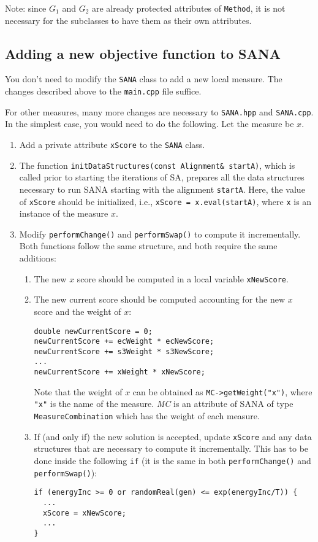 \documentclass[]{article}
\begin{document}
Note: since $G_1$ and $G_2$ are already protected attributes of \texttt{Method}, it is not necessary for the subclasses to have them as their own attributes.

\subsection{Adding a new objective function to SANA}

You don't need to modify the \texttt{SANA} class to add a new local measure. The changes described above to the \texttt{main.cpp} file suffice.

For other measures, many more changes are necessary to \texttt{SANA.hpp} and \texttt{SANA.cpp}. In the simplest case, you would need to do the following. Let the measure be $x$.
\begin{enumerate}
\item Add a private attribute \texttt{xScore} to the \texttt{SANA} class.
\item The function \texttt{initDataStructures(const Alignment\& startA)}, which is called prior to starting the iterations of SA, prepares all the data structures necessary to run SANA starting with the alignment \texttt{startA}. Here, the value of \texttt{xScore} should be initialized, i.e., \texttt{xScore = x.eval(startA)}, where \texttt{x} is an instance of the measure $x$.
\item Modify \texttt{performChange()} and \texttt{performSwap()} to compute it incrementally. Both functions follow the same structure, and both require the same additions:
\begin{enumerate}
\item The new $x$ score should be computed in a local variable \texttt{xNewScore}.
\item The new current score should be computed accounting for the new $x$ score and the weight of $x$:
\begin{verbatim}
double newCurrentScore = 0;
newCurrentScore += ecWeight * ecNewScore;
newCurrentScore += s3Weight * s3NewScore;
...
newCurrentScore += xWeight * xNewScore;
\end{verbatim}
Note that the weight of $x$ can be obtained as \texttt{MC->getWeight("x")}, where \texttt{"x"} is the name of the measure. \emph{MC} is an attribute of SANA of type \texttt{MeasureCombination} which has the weight of each measure.
\item If (and only if) the new solution is accepted, update \texttt{xScore} and any data structures that are necessary to compute it incrementally. This has to be done inside the following \texttt{if} (it is the same in both \texttt{performChange()} and \texttt{performSwap()}):
\begin{verbatim}
if (energyInc >= 0 or randomReal(gen) <= exp(energyInc/T)) {
  ...
  xScore = xNewScore;
  ...
}
\end{verbatim}
\end{enumerate}
\end{enumerate}
\end{document}
